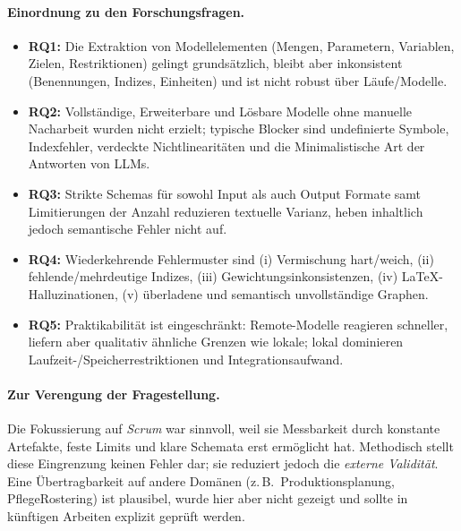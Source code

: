 \documentclass[runningheads]{llncs}
\begin{document}
\paragraph{Einordnung zu den Forschungsfragen.}
\begin{itemize}
    \item \textbf{RQ1:} Die Extraktion von Modellelementen (Mengen, Parametern, Variablen, Zielen, Restriktionen) gelingt grundsätzlich, bleibt aber inkonsistent (Benennungen, Indizes, Einheiten) und ist nicht robust über Läufe/Modelle. 
    \item \textbf{RQ2:} Vollständige, Erweiterbare und Lösbare Modelle ohne manuelle Nacharbeit wurden nicht erzielt; typische Blocker sind undefinierte Symbole, Indexfehler, verdeckte Nichtlinearitäten und die Minimalistische Art der Antworten von LLMs. 
    \item \textbf{RQ3:} Strikte Schemas für sowohl Input als auch Output Formate samt Limitierungen der Anzahl reduzieren textuelle Varianz, heben inhaltlich jedoch semantische Fehler nicht auf. 
    \item \textbf{RQ4:} Wiederkehrende Fehlermuster sind (i) Vermischung hart/weich, (ii) fehlende/mehrdeutige Indizes, (iii) Gewichtungsinkonsistenzen, (iv) LaTeX-Halluzinationen, (v) überladene und semantisch unvollständige Graphen. 
    \item \textbf{RQ5:} Praktikabilität ist eingeschränkt: Remote-Modelle reagieren schneller, liefern aber qualitativ ähnliche Grenzen wie lokale; lokal dominieren Laufzeit-/Speicherrestriktionen und Integrationsaufwand.
\end{itemize}

\paragraph{Zur Verengung der Fragestellung.}
Die Fokussierung auf \emph{Scrum} war sinnvoll, weil sie Messbarkeit durch konstante Artefakte, feste Limits und klare Schemata erst ermöglicht hat. Methodisch stellt diese Eingrenzung keinen Fehler dar; sie reduziert jedoch die \emph{externe Validität}. Eine Übertragbarkeit auf andere Domänen (z.\,B.\ Produktionsplanung, Pflege\-Rostering) ist plausibel, wurde hier aber nicht gezeigt und sollte in künftigen Arbeiten explizit geprüft werden.
\end{document}

